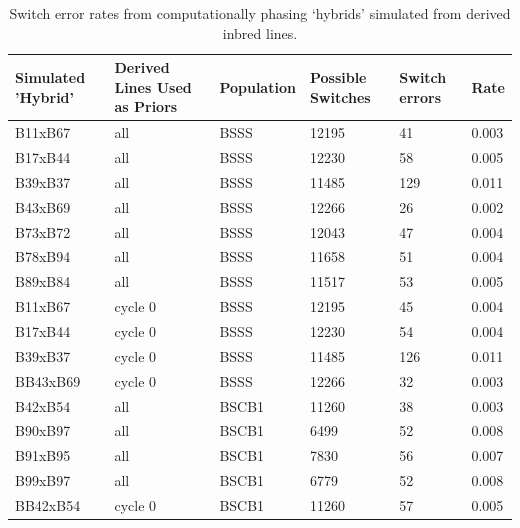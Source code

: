 \begin{table}
\caption{Switch error rates from computationally phasing ‘hybrids’ simulated from derived inbred lines.}
\centering

\begin{tabular}{ | l | l | l | l | l | l | }

\hline
	\textbf{Simulated 'Hybrid'} & \textbf{Derived Lines Used as Priors} & \textbf{Population} & \textbf{Possible Switches} & \textbf{Switch errors} & \textbf{Rate} \\ \hline
	B11xB67 & all & BSSS & 12195 & 41 & 0.003 \\ \hline
	B17xB44 & all & BSSS & 12230 & 58 & 0.005 \\ \hline
	B39xB37 & all & BSSS & 11485 & 129 & 0.011 \\ \hline
	B43xB69 & all & BSSS & 12266 & 26 & 0.002 \\ \hline
	B73xB72 & all & BSSS & 12043 & 47 & 0.004 \\ \hline
	B78xB94 & all & BSSS & 11658 & 51 & 0.004 \\ \hline
	B89xB84 & all & BSSS & 11517 & 53 & 0.005 \\ \hline
	B11xB67 & cycle 0 & BSSS & 12195 & 45 & 0.004 \\ \hline
	B17xB44 & cycle 0 & BSSS & 12230 & 54 & 0.004 \\ \hline
	B39xB37 & cycle 0 & BSSS & 11485 & 126 & 0.011 \\ \hline
	BB43xB69 & cycle 0 & BSSS & 12266 & 32 & 0.003 \\ \hline
	B42xB54 & all & BSCB1 & 11260 & 38 & 0.003 \\ \hline
	B90xB97 & all & BSCB1 & 6499 & 52 & 0.008 \\ \hline
	B91xB95 & all & BSCB1 & 7830 & 56 & 0.007 \\ \hline
	B99xB97 & all & BSCB1 & 6779 & 52 & 0.008 \\ \hline
	BB42xB54 & cycle 0 & BSCB1 & 11260 & 57 & 0.005 \\\hline
\end{tabular}
	\label{tab:phase_error}  %
\end{table}

\clearpage


